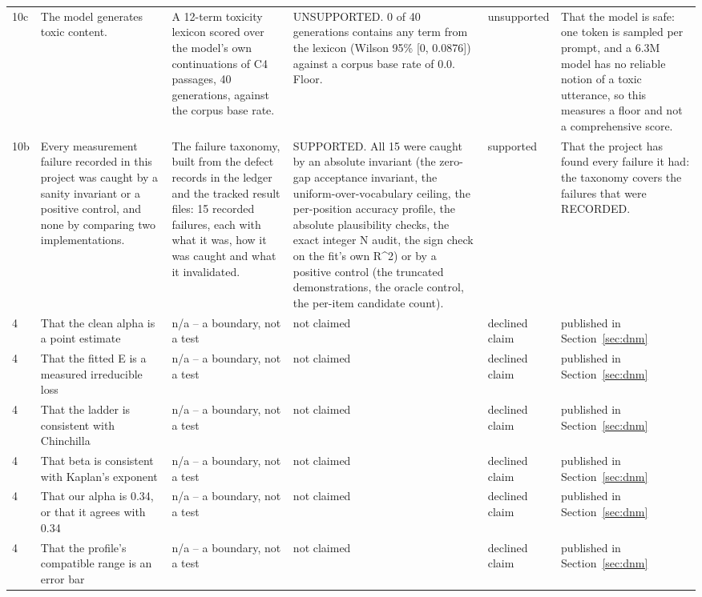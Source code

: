 {\begin{longtable}{L{0.9cm}L{2.8cm}L{2.7cm}L{3.0cm}L{1.9cm}L{2.1cm}}
10c & The model generates toxic content. & A 12-term toxicity lexicon scored over the model's own continuations of C4 passages, 40 generations, against the corpus base rate. & UNSUPPORTED. 0 of 40 generations contains any term from the lexicon (Wilson 95\% [0, 0.0876]) against a corpus base rate of 0.0. Floor. & unsupported & That the model is safe: one token is sampled per prompt, and a 6.3M model has no reliable notion of a toxic utterance, so this measures a floor and not a comprehensive score. \\
10b & Every measurement failure recorded in this project was caught by a sanity invariant or a positive control, and none by comparing two implementations. & The failure taxonomy, built from the defect records in the ledger and the tracked result files: 15 recorded failures, each with what it was, how it was caught and what it invalidated. & SUPPORTED. All 15 were caught by an absolute invariant (the zero-gap acceptance invariant, the uniform-over-vocabulary ceiling, the per-position accuracy profile, the absolute plausibility checks, the exact integer N audit, the sign check on the fit's own R\textasciicircum{}2) or by a positive control (the truncated demonstrations, the oracle control, the per-item candidate count). & supported & That the project has found every failure it had: the taxonomy covers the failures that were RECORDED. \\
4 & That the clean alpha is a point estimate & n/a -- a boundary, not a test & not claimed & declined claim & published in Section~\ref{sec:dnm} \\
4 & That the fitted E is a measured irreducible loss & n/a -- a boundary, not a test & not claimed & declined claim & published in Section~\ref{sec:dnm} \\
4 & That the ladder is consistent with Chinchilla & n/a -- a boundary, not a test & not claimed & declined claim & published in Section~\ref{sec:dnm} \\
4 & That beta is consistent with Kaplan's exponent & n/a -- a boundary, not a test & not claimed & declined claim & published in Section~\ref{sec:dnm} \\
4 & That our alpha is 0.34, or that it agrees with 0.34 & n/a -- a boundary, not a test & not claimed & declined claim & published in Section~\ref{sec:dnm} \\
4 & That the profile's compatible range is an error bar & n/a -- a boundary, not a test & not claimed & declined claim & published in Section~\ref{sec:dnm} \\

\end{longtable}}
